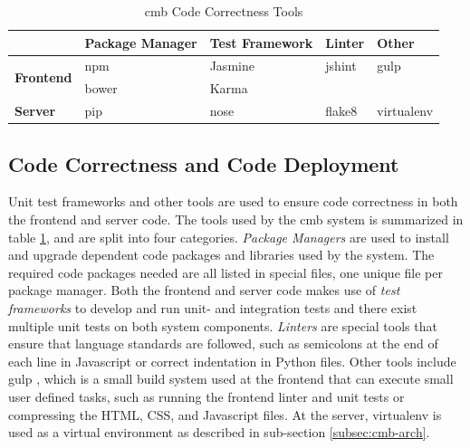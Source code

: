 \begin{table}[b!]
  \centering
  \begin{tabular}{ l|p{2.1cm}|p{2.2cm}|l|l }
    & \textbf{Package Manager} & \raggedright\textbf{Test Framework} & \textbf{Linter} & \textbf{Other} \\ \hline
  \multirow{2}{*}{\textbf{Frontend}} & npm \cite{NPM} & Jasmine \cite{JASMINE} & jshint \cite{JSHINT} & gulp \cite{GULP} \\
                                     & bower \cite{BOWER} & Karma \cite{KARMA} &  &  \\ \hline
  \multirow{1}{*}{\textbf{Server}} & pip \cite{PIP} & nose \cite{NOSE} & flake8 \cite{FLAKE8} & virtualenv \cite{VIRTUALENV}\\
  \end{tabular}
  \caption{\gls{cmb} Code Correctness Tools}
  \label{tab:cct}
\end{table}

\subsection{Code Correctness and Code Deployment}
Unit test frameworks and other tools are used to ensure code correctness in both the frontend and server code. The tools used by the \gls{cmb} system is summarized in table \ref{tab:cct}, and are split into four categories. \textit{Package Managers} are used to install and upgrade dependent code packages and libraries used by the system. The required code packages needed are all listed in special files, one unique file per package manager. Both the frontend and server code makes use of \textit{test frameworks} to develop and run unit- and integration tests and there exist multiple unit tests on both system components. \textit{Linters} are special tools that ensure that language standards are followed, such as semicolons at the end of each line in Javascript or correct indentation in Python files. Other tools include gulp \cite{GULP}, which is a small build system used at the frontend that can execute small user defined tasks, such as running the frontend linter and unit tests or compressing the HTML, CSS, and Javascript files. At the server, virtualenv \cite{VIRTUALENV} is used as a virtual environment as described in sub-section \ref{subsec:cmb-arch}. \\

